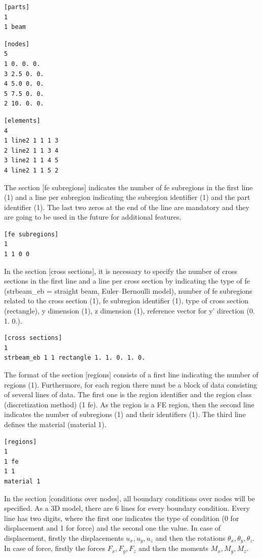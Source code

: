\documentclass[a4]{article}
\begin{document}
\begin{Verbatim}	
[parts]
1
1 beam
\end{Verbatim}

\begin{Verbatim}	
[nodes]
5
1 0. 0. 0.
3 2.5 0. 0.
4 5.0 0. 0.
5 7.5 0. 0.
2 10. 0. 0.
\end{Verbatim}

\begin{Verbatim}	
[elements]
4
1 line2 1 1 1 3
2 line2 1 1 3 4
3 line2 1 1 4 5
4 line2 1 1 5 2
\end{Verbatim}

The section [fe subregions] indicates the number of fe subregions in the first line (1) and a line per subregion indicating the subregion identifier (1) and the part identifier (1). The last two zeros at the end of the line are mandatory and they are going to be used in the
future for additional features.

\begin{Verbatim}
[fe subregions]
1
1 1 0 0
\end{Verbatim}

In the section [cross sections], it is necessary to specify the number of cross sections in the first line and a line per cross section by indicating the type of fe (strbeam\_eb = straight beam, Euler–Bernoulli model), number of fe subregions related to the cross section (1), fe subregion identifier (1), type of cross section (rectangle), y dimension (1), z dimension (1), reference vector for y' direction (0. 1. 0.).

\begin{Verbatim}
[cross sections]
1
strbeam_eb 1 1 rectangle 1. 1. 0. 1. 0.
\end{Verbatim}

The format of the section [regions] consists of a first line indicating the number of regions (1). Furthermore, for each region there must be a block of data consisting of several lines of data. The first one is the region identifier and the region class (discretization method) (1 fe). As the region is a FE region, then the second line indicates the number of subregions (1) and their identifiers (1). The third line defines the material (material 1). 

\begin{Verbatim}	
[regions]
1
1 fe
1 1
material 1
\end{Verbatim}

In the section [conditions over nodes], all boundary conditions over nodes will be specified. As a 3D model, there are 6 lines for every boundary condition. Every line has two digits, where the first one indicates the type of condition (0 for displacement and 1 for force) and the second one the value. In case of displacement, firstly the displacements $u_x, u_y, u_z$ and then the rotations $\theta_x, \theta_y, \theta_z$. In case of force, firstly the forces $F_x, F_y, F_z$ and then the moments $M_x, M_y, M_z$. 
\end{document}
